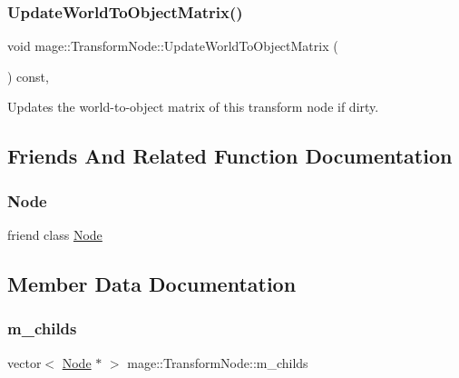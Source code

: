 \subsubsection{\texorpdfstring{Update\+World\+To\+Object\+Matrix()}{UpdateWorldToObjectMatrix()}}
{\footnotesize\ttfamily void mage\+::\+Transform\+Node\+::\+Update\+World\+To\+Object\+Matrix (\begin{DoxyParamCaption}{ }\end{DoxyParamCaption}) const\hspace{0.3cm}{\ttfamily [private]}, {\ttfamily [noexcept]}}

Updates the world-\/to-\/object matrix of this transform node if dirty. 

\subsection{Friends And Related Function Documentation}
\hypertarget{classmage_1_1_transform_node_a6db9d28bd448a131448276ee03de1e6d}{}\label{classmage_1_1_transform_node_a6db9d28bd448a131448276ee03de1e6d} 
\subsubsection{\texorpdfstring{Node}{Node}}
{\footnotesize\ttfamily friend class \hyperlink{classmage_1_1_node}{Node}\hspace{0.3cm}{\ttfamily [friend]}}



\subsection{Member Data Documentation}
\hypertarget{classmage_1_1_transform_node_a0f6be1bd433b1c7226dac7f865dca3a3}{}\label{classmage_1_1_transform_node_a0f6be1bd433b1c7226dac7f865dca3a3} 
\subsubsection{\texorpdfstring{m\+\_\+childs}{m\_childs}}
{\footnotesize\ttfamily vector$<$ \hyperlink{classmage_1_1_node}{Node} $\ast$ $>$ mage\+::\+Transform\+Node\+::m\+\_\+childs\hspace{0.3cm}{\ttfamily [private]}}

